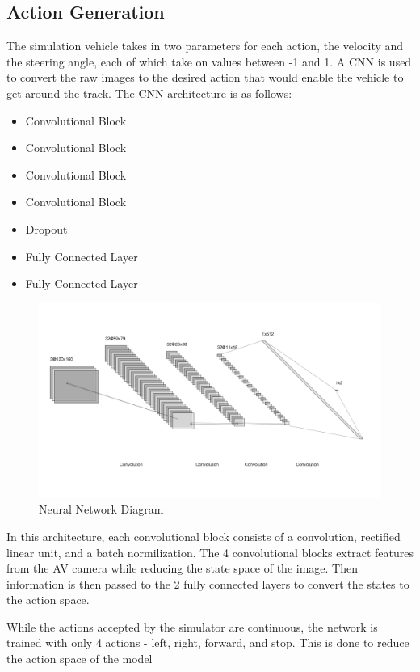 \documentclass[conference]{IEEEtran}
\begin{document}
\subsection{Action Generation}
The simulation vehicle takes in two parameters for each action, the velocity and the steering angle,
each of which take on values between -1 and 1. A CNN is used to convert the raw images to the 
desired action that would enable the vehicle to get around the track.
The CNN architecture is as follows: 
\begin{itemize}
  \item Convolutional Block 
  \item Convolutional Block 
  \item Convolutional Block 
  \item Convolutional Block 
  \item Dropout
  \item Fully Connected Layer
  \item Fully Connected Layer
\end{itemize}
\begin{figure}[H]
  \centering
    \includegraphics[scale=0.20]{neural_net.png}
  \caption{Neural Network Diagram}
\end{figure} \par
In this architecture, each convolutional block consists of a convolution, rectified linear unit, and
a batch normilization. The 4 convolutional blocks extract features from the AV camera while reducing
the state space of the image. Then information is then passed to the 2 fully connected layers to convert 
the states to the action space. \par
While the actions accepted by the simulator are continuous, the network is trained with only 
4 actions - left, right, forward, and stop. This is done to reduce the action space of the model 
\end{document}
